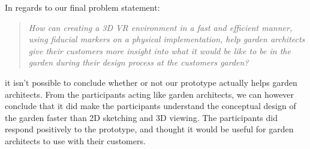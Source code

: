 In regards to our final problem statement:\\
\begin{quote}
	\textit{How can creating a 3D VR environment in a fast and efficient manner, using fiducial markers on a physical implementation, help garden architects give their customers more insight into what it would be like to be in the garden during their design process at the customers garden?}\\
\end{quote}
it isn't possible to conclude whether or not our prototype actually helps garden architects. From the participants acting like garden architects, we can however conclude that it did make the participants understand the conceptual design of the garden faster than 2D sketching and 3D viewing. The participants did respond positively to the prototype, and thought it would be useful for garden architects to use with their customers.\\

\begin{comment}
Can't conclude if clients would benefit from this\\\\
Can't conclude if real garden architects would benefit from this\\\\
Can   conclude that virtual reality helps immersion and spatial detailing\\\\
Can conclude that virtual reality is faster than normal sketching and 3D flyby\\\\
Can't really conclude that garden architect target group would benefit\\\\
But can conclude that participants role playing as garden architects would find it useful\\\\
Can conclude that virtual reality helped participants acting as garden architect clients to better understand the garden design.\\\\
Can't conclude if physical tokens help process or not\\\\
Can't conclude if product makes betterer 3D virtual environment\\\\
Can deduce that it is faster than traditional 3D modeling\\\\
Maybe conclude virtual reality is cool and might help showing normal 3D environments instead of our token based version\\\\
Can't conclude if included plants was enough to diversify garden for participants\\\\
\end{comment}
